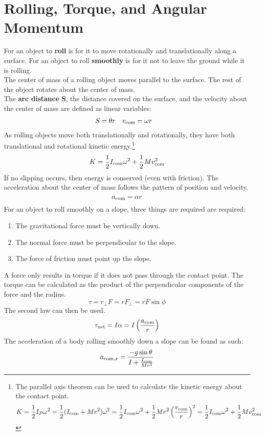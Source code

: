 \documentclass[../AP_Physics_C.tex]{subfiles}
\begin{document}
	\section{Rolling, Torque, and Angular Momentum}
		For an object to \textbf{roll} is for it to move rotationally and translationally along a surface. For an object to roll \textbf{smoothly} is for it not to leave the ground while it is rolling. \\
		The center of mass of a rolling object moves parallel to the surface. The rest of the object rotates about the center of mass. \\
		The \textbf{arc distance} $\pmb{S}$, the distance covered on the surface, and the velocity about the center of mass are defined as linear variables:
		\begin{align*}
			S &= \theta r & v_{\mathrm{com}} &= \omega r
		\end{align*}
		As rolling objects move both translationally and rotationally, they have both translational and rotational kinetic energy.\footnote{
			The parallel axis theorem can be used to calculate the kinetic energy about the contact point.
			\[
				K = \frac{1}{2}I_P\omega^2 = \frac{1}{2}(I_{\mathrm{com}} + Mr^2)\omega^2 = \frac{1}{2}I_{\mathrm{com}}\omega^2 + \frac{1}{2}Mr^2\left(\frac{v_{\mathrm{com}}}{r}\right)^2 = \frac{1}{2}I_{\mathrm{com}}\omega^2 + \frac{1}{2}Mv_{\mathrm{com}}^2		
			\]
			}
		\[K = \frac{1}{2}I_{\mathrm{com}}\omega^2 + \frac{1}{2}Mv_{\mathrm{com}}^2\]
		If no slipping occurs, then energy is conserved (even with friction).
		The acceleration about the center of mass follows the pattern of position and velocity.
		\[a_{\mathrm{com}} = \alpha r\]
		For an object to roll smoothly on a slope, three things are required are required:
		\begin{enumerate}
			\item
				The gravitational force must be vertically down.
			\item
				The normal force must be perpendicular to the slope.
			\item
				The force of friction must point up the slope.
		\end{enumerate}
		A force only results in torque if it does not pass through the contact point. The torque can be calculated as the product of the perpendicular components of the force and the radius.
		\[\tau = r_\bot F = rF_\bot = rF\sin\phi\]
		The second law can then be used.
		\[\tau_{\mathrm{net}} = I\alpha = I\left(\frac{a_{\mathrm{com}}}{r}\right)\]
		The acceleration of a body rolling smoothly down a slope can be found as such:
		\[a_{\mathrm{com},x} = \frac{-g\sin\theta}{I + \frac{I_{\mathrm{com}}}{Mr^2}}\]
\end{document}
